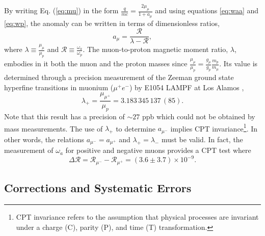 \documentclass{outhesis}
\begin{document}
By writing Eq. (\ref{eq:mu}) in the form $\displaystyle \frac{q}{mc} = \frac{2\mu_{\mu}}{1+a_{\mu}}$ and using equations \ref{eq:waa} and \ref{eq:wp}, the anomaly can be written in terms of dimensionless ratios,
\begin{equation}
a_{\mu} = \frac{\mathcal{R}}{\lambda - \mathcal{R}},
\label{eq:R}
\end{equation}
where $\displaystyle \lambda \equiv \frac{\mu_{\mu}}{\mu_{p}}$ and $\displaystyle \mathcal{R} \equiv \frac{\omega_a}{\omega_p}$.
The muon-to-proton magnetic moment ratio, $\lambda$, embodies in it both the muon and the proton masses since $\displaystyle \frac{\mu_{\mu}}{\mu_{p}} = \frac{g_{\mu}}{g_p}\frac{m_p}{m_{\mu}}$. Its value is determined through a precision measurement of the Zeeman ground state hyperfine transitions in muonium ($\mu^+e^-$) by E1054 LAMPF at Los Alamos \cite{zeeman},
\[\lambda_+ = \frac{\mu_{\mu^+}}{\mu_{p}} = 3.183\, 345\, 137\, (85).\] %
Note that this result has a precision of $\sim 27$ ppb which could not be obtained by mass measurements. The use of $\lambda_+$ to determine $a_{\mu^-}$ implies CPT invariance\footnote{CPT invariance refers to the assumption that physical processes are invariant under a charge (C), parity (P), and time (T) transformation.}. In other words, the relations $a_{\mu^-} = a_{\mu^+}$ and $\lambda_+ = \lambda_-$ must be valid. In fact, the measurement of $\omega_a$ for positive and negative muons provides a CPT test where 
\begin{equation}
\Delta \mathcal{R} = \mathcal{R}_{\mu^-} - \mathcal{R}_{\mu^+} = \left(3.6 \pm 3.7 \right) \times 10^{-9}.
\end{equation}

\subsection{Corrections and Systematic Errors}
\end{document}
